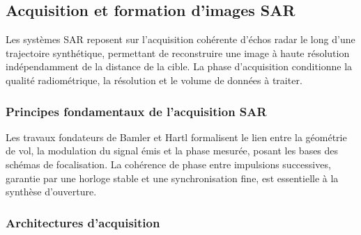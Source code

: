 \subsection{Acquisition et formation d'images SAR}

Les systèmes SAR reposent sur l'acquisition cohérente d'échos radar le long d'une trajectoire synthétique, permettant de reconstruire une image à haute résolution indépendamment de la distance de la cible. La phase d'acquisition conditionne la qualité radiométrique, la résolution et le volume de données à traiter.

\subsubsection{Principes fondamentaux de l’acquisition SAR}

Les travaux fondateurs de Bamler et Hartl \cite{Bamler1993_SAR} formalisent le lien entre la géométrie de vol, la modulation du signal émis et la phase mesurée, posant les bases des schémas de focalisation. La cohérence de phase entre impulsions successives, garantie par une horloge stable et une synchronisation fine, est essentielle à la synthèse d’ouverture.

\subsubsection{Architectures d’acquisition}


